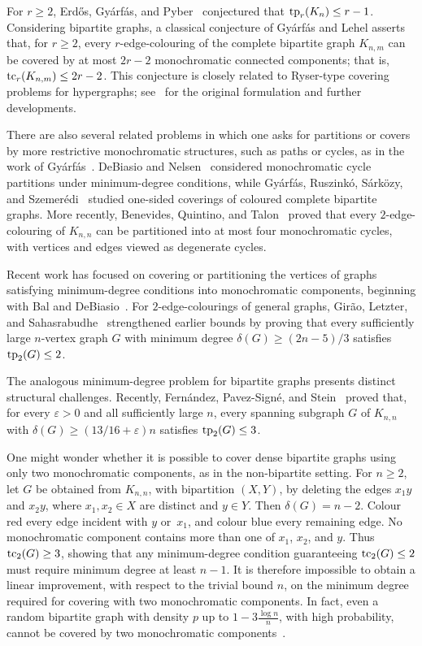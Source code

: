 \documentclass[12pt,reqno,a4paper]{amsart}
\def\tc{\mathop{\text{\rm tc}}\nolimits}
\def\tp{\mathop{\text{\rm tp}}\nolimits}
\begin{document}
For $r\ge2$, Erd\H{o}s, Gy\'arf\'as, and Pyber~\cite{erdos1991vertex}
conjectured that $\tp_r(K_n)\le r-1$. Considering bipartite graphs, a classical
conjecture of Gy\'arf\'as and Lehel asserts that, for $r\ge2$, every
$r$-edge-colouring of the complete bipartite graph $K_{n,m}$ can be covered by
at most $2r-2$ monochromatic connected components; that is, $\tc_r(K_{n,m})\le
2r-2$. This conjecture is closely related to Ryser-type covering problems for
hypergraphs; see~\cite{gyarfas1977partition, lehel1998ryser, chen2012around} for
the original formulation and further developments.

There are also several related problems in which one asks for partitions or
covers by more restrictive monochromatic structures, such as paths or cycles, as in the work of Gy\'arf\'as~\cite{gyarfas1983vertex}. DeBiasio and
Nelsen~\cite{debiasio2016monochromatic} considered monochromatic cycle
partitions under minimum-degree conditions, while Gy\'arf\'as, Ruszink\'o,
S\'ark{\"o}zy, and Szemer\'edi~\cite{gyarfas2006onesided} studied one-sided
coverings of coloured complete bipartite graphs. More recently, Benevides,
Quintino, and Talon~\cite{benevides2024partitioning} proved that every
$2$-edge-colouring of $K_{n,n}$ can be partitioned into at most four monochromatic
cycles, with vertices and edges viewed as degenerate cycles.

Recent work has focused on covering or partitioning the vertices of graphs
satisfying minimum-degree conditions into monochromatic components, beginning
with Bal and DeBiasio~\cite{bal2017partitioning}. For $2$-edge-colourings of general
graphs, Gir\~ao, Letzter, and Sahasrabudhe~\cite{girao2019partitioning}
strengthened earlier bounds by proving that every sufficiently large
$n$-vertex graph $G$ with minimum degree $\delta(G)\ge (2n-5)/3$ satisfies $\tp_2(G)\le 2$.


The analogous minimum-degree problem for bipartite graphs presents distinct
structural challenges. Recently, Fern\'andez, Pavez-Sign\'e, and
Stein~\cite{fernandez2024monochromatic} proved that, for every $\varepsilon>0$
and all sufficiently large $n$, every spanning subgraph $G$ of $K_{n,n}$ with
$\delta(G)\ge(13/16+\varepsilon)n$ satisfies $\tp_2(G)\le3$.

One might wonder whether it is possible to cover dense bipartite graphs using
only two monochromatic components, as in the non-bipartite setting. For
$n\ge2$, let $G$ be obtained from $K_{n,n}$, with bipartition $(X,Y)$, by
deleting the edges $x_1y$ and $x_2y$, where $x_1,x_2\in X$ are distinct and
$y\in Y$. Then $\delta(G)=n-2$. Colour red every edge incident with $y$ or~$x_1$, and colour blue every remaining edge. No monochromatic component
contains more than one of $x_1$, $x_2$, and $y$. Thus $\tc_2(G)\ge3$, showing
that any minimum-degree condition guaranteeing $\tc_2(G)\le2$ must require
minimum degree at least $n-1$. It is therefore impossible to obtain a linear improvement, with respect to the trivial bound $n$, on the minimum degree required for covering with two monochromatic components. In fact, even a random bipartite graph with density $p$ up to $1-3\frac{\log n}{n}$, with high probability, cannot be covered by two monochromatic components~\cite{fernandez2024monochromatic}.   
\end{document}
